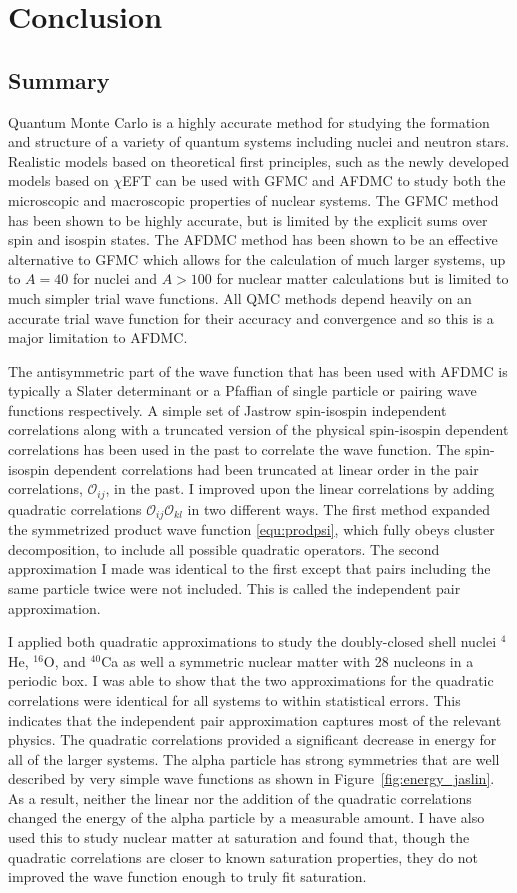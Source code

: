 \chapter{Conclusion}
\section{Summary}
Quantum Monte Carlo is a highly accurate method for studying the formation and structure of a variety of quantum systems including nuclei and neutron stars. Realistic models based on theoretical first principles, such as the newly developed models based on $\chi$EFT can be used with GFMC and AFDMC to study both the microscopic and macroscopic properties of nuclear systems. The GFMC method has been shown to be highly accurate, but is limited by the explicit sums over spin and isospin states. The AFDMC method has been shown to be an effective alternative to GFMC which allows for the calculation of much larger systems, up to $A=40$ for nuclei and $A>100$ for nuclear matter calculations but is limited to much simpler trial wave functions. All QMC methods depend heavily on an accurate trial wave function for their accuracy and convergence and so this is a major limitation to AFDMC.

The antisymmetric part of the wave function that has been used with AFDMC is typically a Slater determinant or a Pfaffian of single particle or pairing wave functions respectively. A simple set of Jastrow spin-isospin independent correlations along with a truncated version of the physical spin-isospin dependent correlations has been used in the past to correlate the wave function. The spin-isospin dependent correlations had been truncated at linear order in the pair correlations, $\mathcal{O}_{ij}$, in the past. I improved upon the linear correlations by adding quadratic correlations $\mathcal{O}_{ij}\mathcal{O}_{kl}$ in two different ways. The first method expanded the symmetrized product wave function \ref{equ:prodpsi}, which fully obeys cluster decomposition, to include all possible quadratic operators. The second approximation I made was identical to the first except that pairs including the same particle twice were not included. This is called the independent pair approximation.

I applied both quadratic approximations to study the doubly-closed shell nuclei $^4$He, $^{16}$O, and $^{40}$Ca as well a symmetric nuclear matter with 28 nucleons in a periodic box. I was able to show that the two approximations for the quadratic correlations were identical for all systems to within statistical errors. This indicates that the independent pair approximation captures most of the relevant physics. The quadratic correlations provided a significant decrease in energy for all of the larger systems. The alpha particle has strong symmetries that are well described by very simple wave functions as shown in Figure~\ref{fig:energy_jaslin}. As a result, neither the linear nor the addition of the quadratic correlations changed the energy of the alpha particle by a measurable amount. I have also used this to study nuclear matter at saturation and found that, though the quadratic correlations are closer to known saturation properties, they do not improved the wave function enough to truly fit saturation.

